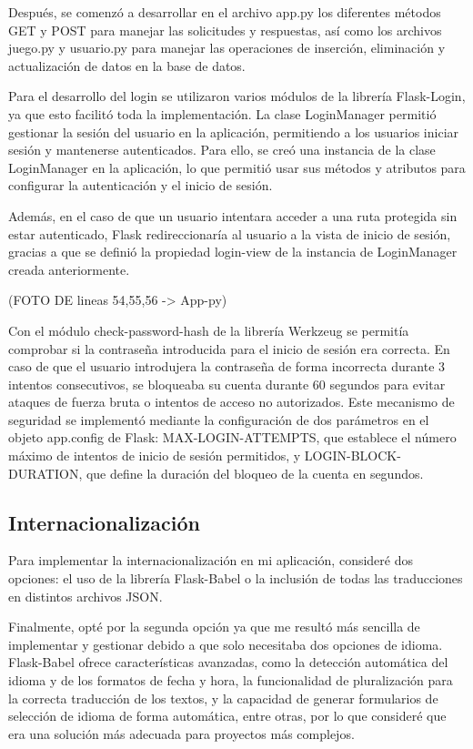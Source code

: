 Después, se comenzó a desarrollar en el archivo app.py los diferentes métodos GET y POST para manejar las solicitudes y respuestas, así como los archivos juego.py y usuario.py para manejar las operaciones de inserción, eliminación y actualización de datos en la base de datos.

Para el desarrollo del login se utilizaron varios módulos de la librería Flask-Login, ya que esto facilitó toda la implementación. La clase LoginManager permitió gestionar la sesión del usuario en la aplicación, permitiendo a los usuarios iniciar sesión y mantenerse autenticados. Para ello, se creó una instancia de la clase LoginManager en la aplicación, lo que permitió usar sus métodos y atributos para configurar la autenticación y el inicio de sesión.

Además, en el caso de que un usuario intentara acceder a una ruta protegida sin estar autenticado, Flask redireccionaría al usuario a la vista de inicio de sesión, gracias a que se definió la propiedad login-view de la instancia de LoginManager creada anteriormente. 

        (FOTO DE lineas 54,55,56 -> App-py)

Con el módulo check-password-hash de la librería Werkzeug se permitía comprobar si la contraseña introducida para el inicio de sesión era correcta. En caso de que el usuario introdujera la contraseña de forma incorrecta durante 3 intentos consecutivos, se bloqueaba su cuenta durante 60 segundos para evitar ataques de fuerza bruta o intentos de acceso no autorizados. Este mecanismo de seguridad se implementó mediante la configuración de dos parámetros en el objeto app.config de Flask: MAX-LOGIN-ATTEMPTS, que establece el número máximo de intentos de inicio de sesión permitidos, y LOGIN-BLOCK-DURATION, que define la duración del bloqueo de la cuenta en segundos.

\subsection{Internacionalización}
Para implementar la internacionalización en mi aplicación, consideré dos opciones: el uso de la librería Flask-Babel o la inclusión de todas las traducciones en distintos archivos JSON.

Finalmente, opté por la segunda opción ya que me resultó más sencilla de implementar y gestionar debido a que solo necesitaba dos opciones de idioma. Flask-Babel ofrece características avanzadas, como la detección automática del idioma y de los formatos de fecha y hora, la funcionalidad de pluralización para la correcta traducción de los textos, y la capacidad de generar formularios de selección de idioma de forma automática, entre otras, por lo que consideré que era una solución más adecuada para proyectos más complejos.

